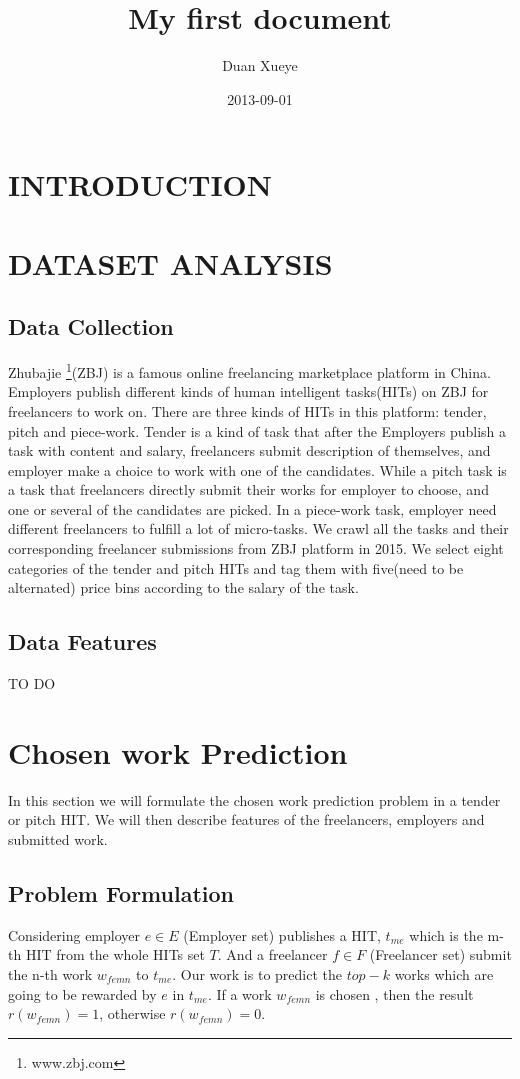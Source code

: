 \documentclass{article}
\title{My first document}
\date{2013-09-01}
\author{Duan Xueye}
\begin{document}
  \maketitle
  \newpage
  \section{INTRODUCTION}
  \section{DATASET ANALYSIS}
  \subsection{Data Collection}
Zhubajie \footnote{\label{footnote1}www.zbj.com}(ZBJ) is a famous online freelancing marketplace platform in China. Employers publish different kinds of human intelligent tasks(HITs) on  ZBJ for freelancers to work on. There are three kinds of HITs in this platform: tender, pitch and piece-work. Tender  is a kind of task that after the Employers publish a task with content and salary, freelancers submit description of themselves, and employer make a choice to work with one of the candidates. While a pitch task is a task that freelancers directly submit their works for employer to choose, and one or several of the candidates are picked. In a piece-work task, employer need different freelancers to fulfill a lot of micro-tasks. We crawl all the tasks and their corresponding freelancer submissions from  ZBJ platform in 2015. We select eight categories of the tender and pitch HITs and tag them with five(need to be alternated) price bins according to the salary of the task.
  \subsection{Data Features} TO DO
 \section{ Chosen work Prediction}
 In this section we will formulate the chosen work prediction problem in a tender or pitch HIT. We will then describe features of the freelancers, employers and submitted work.
 \subsection{Problem Formulation}
Considering employer $e \in E$ (Employer set) publishes a HIT, ${t}_{me}$ which is the m-th HIT from the  whole HITs set $T$. And a freelancer $f \in F$ (Freelancer set) submit the n-th work ${w}_{femn}$ to  ${t}_{me}$. Our work is to predict the $top-k$ works which are going to be rewarded by $e$ in ${t}_{me}$.  If a work ${w}_{femn}$ is chosen , then the result  $r({w}_{femn})=1$, otherwise $r({w}_{femn})=0$.
\end{document}
